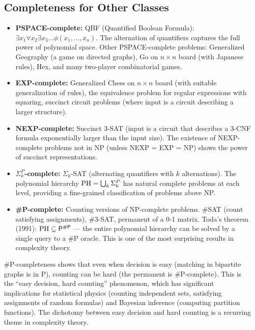 \subsection{Completeness for Other Classes}
\label{sec:np:other_complete}

\begin{itemize}
\item \textbf{PSPACE-complete:} QBF (Quantified Boolean Formula): $\exists x_1 \forall x_2 \exists x_3 \dots \phi(x_1,\dots,x_n)$. The alternation of quantifiers captures the full power of polynomial space. Other PSPACE-complete problems: Generalized Geography (a game on directed graphs), Go on $n \times n$ board (with Japanese rules), Hex, and many two-player combinatorial games.
\item \textbf{EXP-complete:} Generalized Chess on $n \times n$ board (with suitable generalization of rules), the equivalence problem for regular expressions with squaring, succinct circuit problems (where input is a circuit describing a larger structure).
\item \textbf{NEXP-complete:} Succinct 3-SAT (input is a circuit that describes a 3-CNF formula exponentially larger than the input size). The existence of NEXP-complete problems not in NP (unless NEXP = EXP = NP) shows the power of succinct representations.
\item \textbf{$\Sigma_k^P$-complete:} $\Sigma_k$-SAT (alternating quantifiers with $k$ alternations). The polynomial hierarchy $\text{PH} = \bigcup_k \Sigma_k^P$ has natural complete problems at each level, providing a fine-grained classification of problems above NP.
\item \textbf{\#P-complete:} Counting versions of NP-complete problems. \#SAT (count satisfying assignments), \#3-SAT, permanent of a 0-1 matrix. Toda's theorem (1991): $\text{PH} \subseteq \mathsf{P}^{\#\mathsf{P}}$ — the entire polynomial hierarchy can be solved by a single query to a \#P oracle. This is one of the most surprising results in complexity theory.
\end{itemize}

\#P-completeness shows that even when decision is easy (matching in bipartite graphs is in P), counting can be hard (the permanent is \#P-complete). This is the ``easy decision, hard counting'' phenomenon, which has significant implications for statistical physics (counting independent sets, satisfying assignments of random formulas) and Bayesian inference (computing partition functions). The dichotomy between easy decision and hard counting is a recurring theme in complexity theory.

